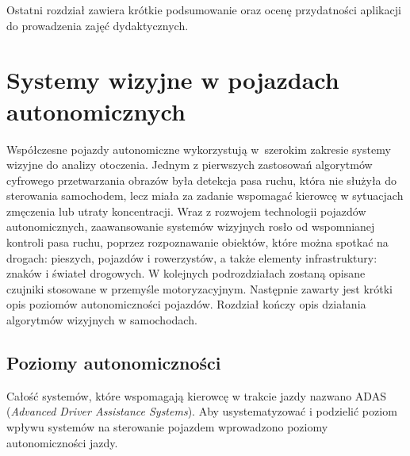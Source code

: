 Ostatni rozdział zawiera krótkie podsumowanie oraz ocenę przydatności aplikacji do prowadzenia zajęć dydaktycznych.

\chapter{Systemy wizyjne w pojazdach autonomicznych}

Współczesne pojazdy autonomiczne wykorzystują w~szerokim zakresie systemy wizyjne do analizy otoczenia. 
Jednym z pierwszych zastosowań algorytmów cyfrowego przetwarzania obrazów była detekcja pasa ruchu, która nie służyła do sterowania samochodem, lecz miała za zadanie wspomagać kierowcę w sytuacjach zmęczenia lub utraty koncentracji. 
Wraz z rozwojem technologii pojazdów autonomicznych, zaawansowanie systemów wizyjnych rosło od wspomnianej kontroli pasa ruchu, poprzez rozpoznawanie obiektów, które można spotkać na drogach: pieszych, pojazdów i rowerzystów, a także elementy infrastruktury: znaków i świateł drogowych.
W kolejnych podrozdziałach zostaną opisane czujniki stosowane w przemyśle motoryzacyjnym. Następnie zawarty jest krótki opis poziomów autonomiczności pojazdów. Rozdział kończy opis działania algorytmów wizyjnych w samochodach.


\section{Poziomy autonomiczności}

Całość systemów, które wspomagają kierowcę w trakcie jazdy nazwano ADAS (\textit{Advanced Driver Assistance Systems}). 
Aby usystematyzować i podzielić poziom wpływu systemów na sterowanie pojazdem wprowadzono poziomy autonomiczności jazdy.

